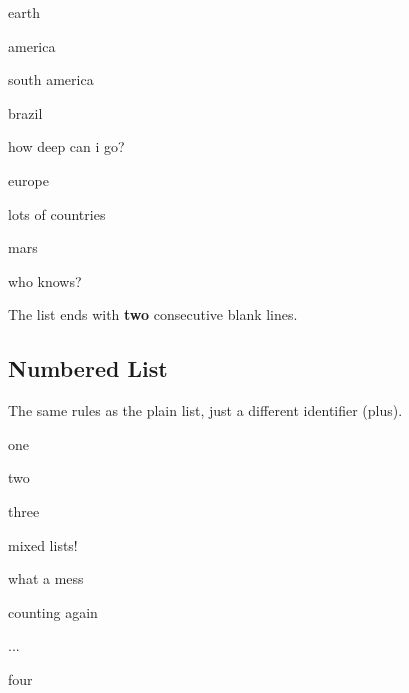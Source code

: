 \documentclass{article}
\begin{document}
\begin{compactitem}
\item earth
  \begin{compactitem}
  \item america
    \begin{compactitem}
    \item south america
      \begin{compactitem}
      \item brazil
      \item how deep can i go?
      \end{compactitem}
    \end{compactitem}
  \item europe
    \begin{compactitem}
    \item lots of countries
    \end{compactitem}
  \end{compactitem}
\item mars
  \begin{compactitem}
  \item who knows?
  \end{compactitem}
\end{compactitem}

The list ends with \textbf{two} consecutive blank lines.

\subsection*{Numbered List}

The same rules as the plain list, just a different
identifier (plus).

\begin{compactenum}
\item one
\item two
\item three
  \begin{compactitem}
  \item mixed lists!
  \item what a mess
    \begin{compactenum}
    \item counting again
    \item ...
    \end{compactenum}
  \end{compactitem}
\item four
\end{compactenum}
\end{document}
